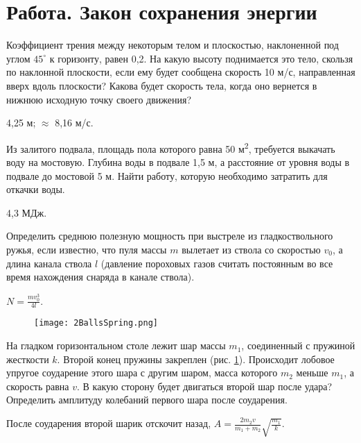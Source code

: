 \section{Работа. Закон сохранения энергии}

\begin{ex} %
Коэффициент трения между некоторым телом и плоскостью, наклоненной под углом $45^{\circ}$ к горизонту, равен 0,2. На какую высоту поднимается это тело, скользя по наклонной плоскости, если ему будет сообщена скорость 10 м/с, направленная вверх вдоль плоскости? Какова будет скорость тела, когда оно вернется в нижнюю исходную точку своего движения?
\begin{ans}
4,25 м; $\approx$ 8,16 м/с.
\end{ans}
\end{ex}

\begin{ex} %
Из залитого подвала, площадь пола которого равна 50 м\textsuperscript{2}, требуется выкачать воду на мостовую. Глубина воды в подвале 1,5 м, а расстояние от уровня воды в подвале до мостовой 5 м. Найти работу, которую необходимо затратить для откачки воды.
\begin{ans}
4,3 МДж.
\end{ans}
\end{ex}

\begin{ex} %
Определить среднюю полезную мощность при выстреле из гладкоствольного ружья, если известно, что пуля массы $m$ вылетает из ствола со скоростью $v_0$, а длина канала ствола $l$ (давление пороховых газов считать постоянным во все время нахождения снаряда в канале ствола).
\begin{ans}
$N =\frac{mv_{0}^3}{4l}$.
\end{ans}
\end{ex}


\begin{figure}
\centering
\texttt{[image: 2BallsSpring.png]}
\caption{}
\label{2BallsSpring}
\end{figure}
\begin{ex} %
На гладком горизонтальном столе лежит шар массы $m_1$, соединенный с пружиной жесткости $k$. Второй конец пружины закреплен (рис. \ref{2BallsSpring}). Происходит лобовое упругое соударение этого шара с другим шаром, масса которого $m_2$ меньше $m_1$, а скорость равна $v$. В какую сторону будет двигаться второй шар после удара? Определить амплитуду колебаний первого шара после соударения.
\begin{ans}
После соударения второй шарик отскочит назад, $A = \frac{2m_2v}{m_1+m_2}\sqrt{\frac{m_1}{k}}$.
\end{ans}
\end{ex}

